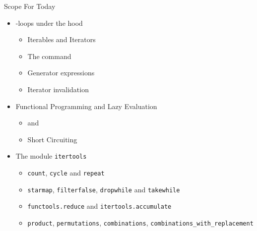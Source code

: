 \begin{frame}{Scope For Today}
%
\begin{itemize}
\item {}-loops under the hood
	\begin{itemize}
	\item Iterables and Iterators
	\item The command 
	\item Generator expressions
	\item Iterator invalidation
	\end{itemize}
\item Functional Programming and Lazy Evaluation
	\begin{itemize}
	\item {} and 
	\item Short Circuiting
	\end{itemize}
\item The module \texttt{itertools}
	\begin{itemize}
	\item \texttt{count}, \texttt{cycle} and \texttt{repeat}
	\item \texttt{starmap}, \texttt{filterfalse}, \texttt{dropwhile} and \texttt{takewhile}
	\item \texttt{functools.reduce} and \texttt{itertools.accumulate}
	\item \texttt{product}, \texttt{permutations}, \texttt{combinations}, \texttt{combinations\_with\_replacement}
	\end{itemize}
\end{itemize}
%
\end{frame}


